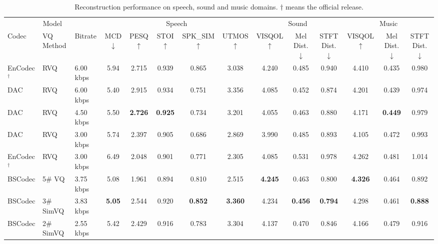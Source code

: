 \documentclass[11pt]{article}
\begin{document}
\begin{table}[t]
\centering
\scriptsize
\setlength{\tabcolsep}{2pt}
\caption{Reconstruction performance on speech, sound and music domains. $\dagger$ means the official release.}
\vspace{-10pt}
\label{tab:reconstruction_results}
\begin{tabular}{lllccccccccccc}
\toprule
\multicolumn{3}{c}{Model} & \multicolumn{5}{c}{Speech} & \multicolumn{3}{c}{Sound} & \multicolumn{3}{c}{Music} \\
\cmidrule(lr){1-3} \cmidrule(lr){4-8} \cmidrule(lr){9-11} \cmidrule(lr){12-14}
Codec & VQ Method & Bitrate & MCD$\downarrow$ & PESQ$\uparrow$ & STOI$\uparrow$ & SPK\_SIM$\uparrow$ & UTMOS$\uparrow$ & VISQOL$\uparrow$ & Mel Dist.$\downarrow$ & STFT Dist.$\downarrow$ & VISQOL$\uparrow$ & Mel Dist.$\downarrow$ & STFT Dist.$\downarrow$ \\
\midrule
EnCodec$^\dagger$ & RVQ & 6.00 kbps & 5.94 & 2.715 & 0.939 & 0.865 & 3.038 & 4.240 & 0.485 & 0.940 & 4.410 & 0.435 & 0.980 \\
DAC & RVQ & 6.00 kbps & 5.40 & 2.915 & 0.934 & 0.751 & 3.356 & 4.085 & 0.452 & 0.874 & 4.201 & 0.439 & 0.974 \\
\midrule
DAC & RVQ & 4.50 kbps & 5.50 & \textbf{2.726} & \textbf{0.925} & 0.734 & 3.201 & 4.055 & 0.463 & 0.880 & 4.171 & \textbf{0.449} & 0.979 \\
DAC & RVQ & 3.00 kbps & 5.74 & 2.397 & 0.905 & 0.686 & 2.869 & 3.990 & 0.485 & 0.893 & 4.105 & 0.472 & 0.993 \\
EnCodec$^\dagger$ & RVQ & 3.00 kbps & 6.49 & 2.048 & 0.901 & 0.771 & 2.305 & 4.085 & 0.531 & 0.978 & 4.262 & 0.481 & 1.014 \\
BSCodec & 5\# VQ & 3.75 kbps & 5.08 & 1.961 & 0.894 & 0.810 & 2.515 & \textbf{4.245} & 0.463 & 0.800 & \textbf{4.326} & 0.464 & 0.892 \\
BSCodec & 3\# SimVQ & 3.83 kbps & \textbf{5.05} & 2.544 & 0.920 & \textbf{0.852} & \textbf{3.360} & 4.234 & \textbf{0.456} & \textbf{0.794} & 4.298 & 0.461 & \textbf{0.888} \\
BSCodec & 2\# SimVQ & 2.55 kbps & 5.42 & 2.429 & 0.916 & 0.783 & 3.304 & 4.137 & 0.470 & 0.846 & 4.166 & 0.479 & 0.916 \\
\bottomrule
\end{tabular}
\vspace{-10pt}
\raggedright
\end{table}
\end{document}

